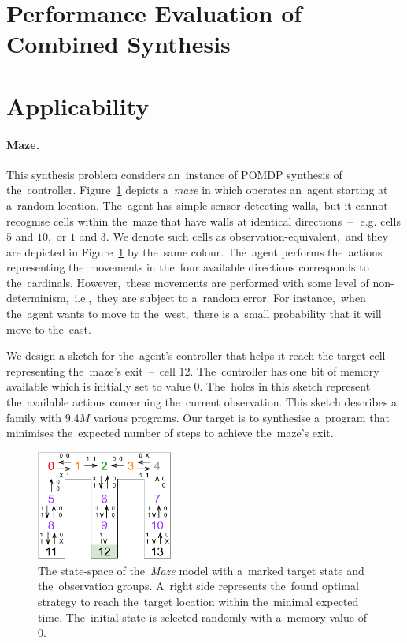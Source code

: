 \section{Performance Evaluation of Combined Synthesis}

\section{Applicability}

\paragraph{Maze.} 
This synthesis problem considers an~instance of POMDP synthesis of the~controller.
Figure~\ref{fig:maze} depicts a~\emph{maze} in which operates an~agent starting at a~random location.
The~agent has simple sensor detecting walls,~but it cannot recognise cells within the~maze that have walls at identical directions \,--\,~e.g. cells $5$ and $10$,~or $1$ and $3$.
We denote such cells as observation-equivalent,~and they are depicted in Figure~\ref{fig:maze} by the~same colour.
The~agent performs the~actions representing the~movements in the~four available directions corresponds to the~cardinals.
However,~these movements are performed with some level of non-determinism,~i.e.,~they are subject to a~random error.
For instance,~when the~agent wants to move to the~west,~there is a~small probability that it will move to the~east.

We design a sketch for the~agent's controller that helps it reach the target cell representing the~maze's exit \,--\, cell 12.
The~controller has one bit of memory available which is initially set to value $0$.
The~holes in this sketch represent the~available actions concerning the~current observation.
This sketch describes a family with $9.4M$ various programs.
Our target is to synthesise a~program that minimises the~expected number of steps to achieve the~maze's exit.

\begin{figure}[ht!]
\centering
\includegraphics[width=0.4\textwidth]{figures/maze.pdf}
\caption{The state-space of the~\textit{Maze} model with a~marked target state and the~observation groups. A~right side represents the~found optimal strategy to reach the~target location within the~minimal expected time. The~initial state is selected randomly with a~memory value of 0.}%
\label{fig:maze}%
\end{figure}
